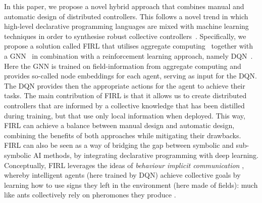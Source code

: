 \documentclass[conference]{IEEEtran}
\begin{document}
In this paper, we propose a novel hybrid approach that combines manual and automatic design of distributed controllers.
This follows a novel trend in which high-level declarative programming languages are mixed with machine learning techniques in order to synthesise robust collective controllers~\cite{DBLP:conf/acsos/Aguzzi21,DBLP:conf/icdcs/AguzziCV22,DBLP:conf/coordination/AguzziCV22}.
Specifically, we propose a solution called \ac{FIRL} that utilises aggregate computing~\cite{Beal2015Computer} together with a \ac{GNN}~\cite{Zhou2020AIOpen} in combination with a reinforcement learning approach, namely \ac{DQN}~\cite{mnih2015human}. 
 Here the \ac{GNN} is trained on field-information from aggregate computing and provides so-called node embeddings for each agent, serving as input for the \ac{DQN}. 
 The \ac{DQN} provides then the appropriate actions for the agent to achieve their tasks.
%
The main contribution of \ac{FIRL} is that it allows us to create distributed controllers that are informed by a collective knowledge that has been distilled during training, but that use only local information when deployed. This way, \ac{FIRL} can achieve a balance between manual design and automatic design, combining the benefits of both approaches while mitigating their drawbacks.
\ac{FIRL} can also be seen as a way of bridging the gap between symbolic and sub-symbolic AI methods, by integrating declarative programming with deep learning.
%
Conceptually, \ac{FIRL} leverages the ideas of \emph{behaviour implicit communication} \cite{DBLP:journals/ijaci/CastelfranchiPT10} \cite{DBLP:conf/e4mas/TummoliniCRVO04}, whereby intelligent agents (here trained by DQN) achieve collective goals by learning how to use signs they left in the environment (here made of fields): much like ants collectively rely on pheromones they produce \cite{DBLP:journals/anor/Parunak97}.
\end{document}

